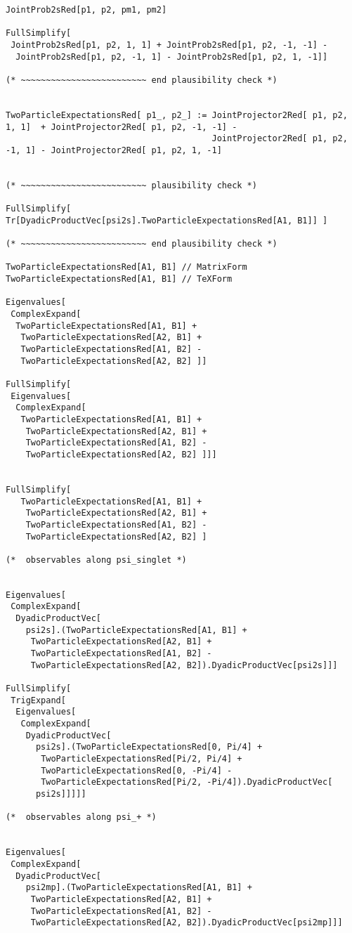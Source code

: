 \documentclass[%
  twocolumn,
 showpacs,
 showkeys,
 preprintnumbers,
 amsmath,amssymb,
 aps,
  pra,
  longbibliography,
 floatfix,
 ]{revtex4-1}
\begin{document}
{\begin{lstlisting}[backgroundcolor=\color{yellow!10},framerule=0pt,breaklines=true, frame=tb]
JointProb2sRed[p1, p2, pm1, pm2]

FullSimplify[
 JointProb2sRed[p1, p2, 1, 1] + JointProb2sRed[p1, p2, -1, -1] -
  JointProb2sRed[p1, p2, -1, 1] - JointProb2sRed[p1, p2, 1, -1]]

(* ~~~~~~~~~~~~~~~~~~~~~~~~~ end plausibility check *)


TwoParticleExpectationsRed[ p1_, p2_] := JointProjector2Red[ p1, p2, 1, 1]  + JointProjector2Red[ p1, p2, -1, -1] -
                                         JointProjector2Red[ p1, p2, -1, 1] - JointProjector2Red[ p1, p2, 1, -1]


(* ~~~~~~~~~~~~~~~~~~~~~~~~~ plausibility check *)

FullSimplify[ Tr[DyadicProductVec[psi2s].TwoParticleExpectationsRed[A1, B1]] ]

(* ~~~~~~~~~~~~~~~~~~~~~~~~~ end plausibility check *)

TwoParticleExpectationsRed[A1, B1] // MatrixForm
TwoParticleExpectationsRed[A1, B1] // TeXForm

Eigenvalues[
 ComplexExpand[
  TwoParticleExpectationsRed[A1, B1] +
   TwoParticleExpectationsRed[A2, B1] +
   TwoParticleExpectationsRed[A1, B2] -
   TwoParticleExpectationsRed[A2, B2] ]]

FullSimplify[
 Eigenvalues[
  ComplexExpand[
   TwoParticleExpectationsRed[A1, B1] +
    TwoParticleExpectationsRed[A2, B1] +
    TwoParticleExpectationsRed[A1, B2] -
    TwoParticleExpectationsRed[A2, B2] ]]]


FullSimplify[
   TwoParticleExpectationsRed[A1, B1] +
    TwoParticleExpectationsRed[A2, B1] +
    TwoParticleExpectationsRed[A1, B2] -
    TwoParticleExpectationsRed[A2, B2] ]

(*  observables along psi_singlet *)


Eigenvalues[
 ComplexExpand[
  DyadicProductVec[
    psi2s].(TwoParticleExpectationsRed[A1, B1] +
     TwoParticleExpectationsRed[A2, B1] +
     TwoParticleExpectationsRed[A1, B2] -
     TwoParticleExpectationsRed[A2, B2]).DyadicProductVec[psi2s]]]

FullSimplify[
 TrigExpand[
  Eigenvalues[
   ComplexExpand[
    DyadicProductVec[
      psi2s].(TwoParticleExpectationsRed[0, Pi/4] +
       TwoParticleExpectationsRed[Pi/2, Pi/4] +
       TwoParticleExpectationsRed[0, -Pi/4] -
       TwoParticleExpectationsRed[Pi/2, -Pi/4]).DyadicProductVec[
      psi2s]]]]]

(*  observables along psi_+ *)


Eigenvalues[
 ComplexExpand[
  DyadicProductVec[
    psi2mp].(TwoParticleExpectationsRed[A1, B1] +
     TwoParticleExpectationsRed[A2, B1] +
     TwoParticleExpectationsRed[A1, B2] -
     TwoParticleExpectationsRed[A2, B2]).DyadicProductVec[psi2mp]]]


\end{lstlisting}}
\end{document}
